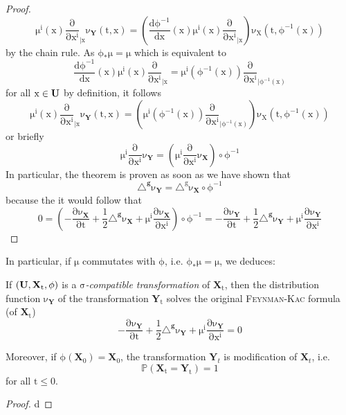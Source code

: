 \documentclass[10 pt,english]{smfart}
\newcommand{\Xt}{\mathrm{\mathbf{X}}_{t}}
\newcommand{\X}{\mathrm{\mathbf{X}}}
\newcommand{\Yt}{\mathrm{\mathbf{Y}}_{t}}
\newcommand{\Y}{\mathrm{\mathbf{Y}}}
\newcommand{\g}{\mathrm{\mathbf{g}}}
\newcommand{\U}{{\bf{U}}}
\begin{document}
\begin{proof}
\begin{equation}
\mathrm{\mu^{i}(x)\frac{\partial}{\partial x^{i}}_{\vert x}\nu_{\Y}(t,x)=\left(\frac{d\phi^{-1}}{dx}\left(x\right)\mu^{i}(x)\frac{\partial}{\partial x^{i}}_{\vert x}\right)\nu_{X}(t,\phi^{-1}(x))}
\end{equation} by the chain rule. As $\mathrm{\phi_{*}\mu = \mu}$ which is equivalent to
\begin{equation}
\mathrm{\frac{d\phi^{-1}}{dx}\left(x\right)\mu^{i}(x)\frac{\partial}{\partial x^{i}}_{\vert x}=\mu^{i}\left(\phi^{-1}(x)\right)\frac{\partial}{\partial x^{i}}_{\vert \phi^{-1}(x)}}
\end{equation} for all $\mathrm{x\in\U}$ by definition, it follows
\begin{equation}
\mathrm{\mu^{i}(x)\frac{\partial}{\partial x^{i}}_{\vert x}\nu_{\Y}(t,x)=\left(\mu^{i}\left(\phi^{-1}(x)\right)\frac{\partial}{\partial x^{i}}_{\vert \phi^{-1}(x)}\right)\nu_{X}(t,\phi^{-1}(x))}
\end{equation} or briefly 
\begin{equation}
\mathrm{\mu^{i}\frac{\partial}{\partial x^{i}}\nu_{\Y}=\left(\mu^{i}\frac{\partial}{\partial x^{i}}\nu_{\X}\right)\circ \phi^{-1}}
\end{equation} In particular, the theorem is proven as soon as we have shown that 
\begin{equation}\label{invarianceoflaplacian}
\mathrm{\triangle^{\g}\nu_{\Y}=\triangle^{g}\nu_{\X}\circ \phi^{-1}}
\end{equation} because the it would follow that
\begin{equation}
\mathrm{0=\left(-\frac{\partial \nu_{\X}}{\partial t}+\frac{1}{2}\triangle^{\g}\nu_{\X}+\mu^{i}\frac{\partial \nu_{\X}}{\partial x^{i}}\right)\circ\phi^{-1}=-\frac{\partial \nu_{\Y}}{\partial t}+\frac{1}{2}\triangle^{\g}\nu_{\Y}+\mu^{i}\frac{\partial \nu_{\Y}}{\partial x^{i}}}
\end{equation} 
\end{proof}

In particular, if $\mathrm{\mu}$ commutates with $\mathrm{\phi}$, i.e. $\mathrm{\phi_{*}\mu=\mu}$, we deduces:

\begin{coro} If $\mathrm{(\U,\Xt,\phi)}$ is a $\mathrm{\sigma}$\textit{-compatible transformation} of $\mathrm{\Xt}$, then the distribution function $\mathrm{\nu_{\Y}}$ of the transformation $\mathrm{\Yt}$ solves the original {\scshape{Feynman-Kac}} formula (of $\mathrm{\Xt}$)
\begin{equation}
\mathrm{-\frac{\partial \nu_{\Y}}{\partial t}+\frac{1}{2}\triangle^{\g}\nu_{\Y}+\mu^{i}\frac{\partial \nu_{\Y}}{\partial x^{i}}=0}
\end{equation} 

Moreover, if $\mathrm{\phi(\X_{0})=\X_{0}}$, the transformation $\Yt$ is modification of $\Xt$, i.e.
\begin{equation}
\mathrm{\mathbb{P}(\Xt =\Yt)=1}
\end{equation} for all $\mathrm{t\leq 0}$.
\end{coro}
\begin{proof} d
\end{proof}
\end{document}
